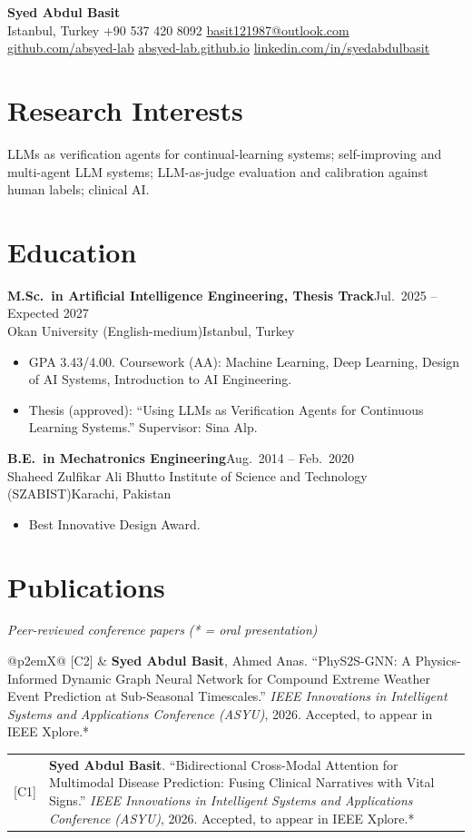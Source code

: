 \documentclass[11pt,letterpaper]{article}
\makeatletter
\newcommand{\entry}[4]{
  \textbf{#1}\hfill #2\\
  #3\hfill #4\par\vspace{1pt}}
\newcommand{\pub}[4]{
  \begin{tabularx}{\linewidth}{@{}p{2em}X@{}}
  #1 & #2. ``#3.'' #4
  \end{tabularx}\par\vspace{2pt}}
\makeatother
\begin{document}
\begin{center}
  {\Large\bfseries Syed Abdul Basit}\\[3pt]
  Istanbul, Turkey \;\textbullet\; +90 537 420 8092 \;\textbullet\;
  \href{mailto:basit121987@outlook.com}{basit121987@outlook.com}\\[1pt]
  \href{https://github.com/absyed-lab}{github.com/absyed-lab} \;\textbullet\;
  \href{https://absyed-lab.github.io}{absyed-lab.github.io} \;\textbullet\;
  \href{https://linkedin.com/in/syedabdulbasit}{linkedin.com/in/syedabdulbasit}
\end{center}

\section{Research Interests}
LLMs as verification agents for continual-learning systems; self-improving and multi-agent LLM systems;
LLM-as-judge evaluation and calibration against human labels; clinical AI.

\section{Education}
\entry{M.Sc.\ in Artificial Intelligence Engineering, Thesis Track}{Jul.\ 2025 -- Expected 2027}
      {Okan University (English-medium)}{Istanbul, Turkey}
\begin{itemize}
  \item GPA 3.43/4.00. Coursework (AA): Machine Learning, Deep Learning, Design of AI Systems, Introduction to AI Engineering.
  \item Thesis (approved): ``Using LLMs as Verification Agents for Continuous Learning Systems.'' Supervisor: Sina Alp.
\end{itemize}
\vspace{2pt}
\entry{B.E.\ in Mechatronics Engineering}{Aug.\ 2014 -- Feb.\ 2020}
      {Shaheed Zulfikar Ali Bhutto Institute of Science and Technology (SZABIST)}{Karachi, Pakistan}
\begin{itemize}
  \item Best Innovative Design Award.
\end{itemize}

\section{Publications}
\textit{Peer-reviewed conference papers} \hfill \textit{(* = oral presentation)}\par\vspace{2pt}
\pub{[C2]}{\textbf{Syed Abdul Basit}, Ahmed Anas}
    {PhyS2S-GNN: A Physics-Informed Dynamic Graph Neural Network for Compound Extreme Weather Event Prediction at Sub-Seasonal Timescales}
    {\textit{IEEE Innovations in Intelligent Systems and Applications Conference (ASYU)}, 2026. Accepted, to appear in IEEE Xplore.*}
\pub{[C1]}{\textbf{Syed Abdul Basit}}
    {Bidirectional Cross-Modal Attention for Multimodal Disease Prediction: Fusing Clinical Narratives with Vital Signs}
    {\textit{IEEE Innovations in Intelligent Systems and Applications Conference (ASYU)}, 2026. Accepted, to appear in IEEE Xplore.*}
\end{document}
